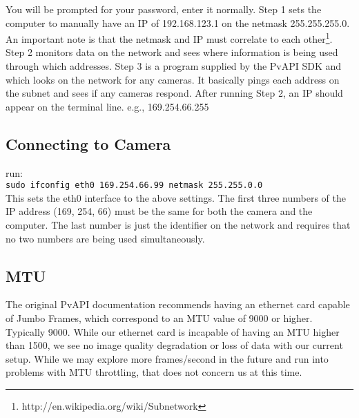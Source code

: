 \documentclass[10pt,a4paper]{article}
\begin{document}
You will be prompted for your password, enter it normally. Step 1 sets the computer to manually have an IP of 192.168.123.1 on the netmask 255.255.255.0. An important note is that the netmask and IP must correlate to each other\footnote{http://en.wikipedia.org/wiki/Subnetwork}. Step 2 monitors data on the network and sees where information is being used through which addresses. Step 3 is a program supplied by the PvAPI SDK and which looks on the network for any cameras. It basically pings each address on the subnet and sees if any cameras respond. After running Step 2, an IP should appear on the terminal line. e.g., 169.254.66.255

\subsection{Connecting to Camera}\label{jcon}
run:\\
\texttt{sudo ifconfig eth0 169.254.66.99 netmask 255.255.0.0}\\

This sets the eth0 interface to the above settings. The first three numbers of the IP address (169, 254, 66) must be the same for both the camera and the computer. The last number is just the identifier on the network and requires that no two numbers are being used simultaneously. 

\subsection{MTU}
The original PvAPI documentation recommends having an ethernet card capable of Jumbo Frames, which correspond to an MTU value of 9000 or higher. Typically 9000. While our ethernet card is incapable of having an MTU higher than 1500, we see no image quality degradation or loss of data with our current setup. While we may explore more frames/second in the future and run into problems with MTU throttling, that does not concern us at this time.
\end{document}
